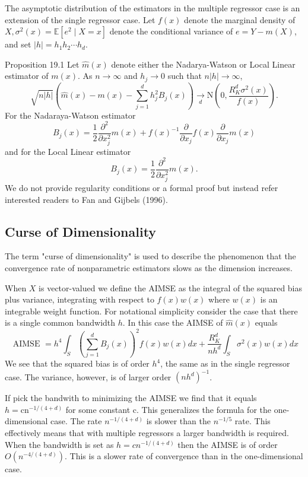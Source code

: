 \documentclass[10pt]{article}
\begin{document}
The asymptotic distribution of the estimators in the multiple regressor case is an extension of the single regressor case. Let $f(x)$ denote the marginal density of $X, \sigma^{2}(x)=\mathbb{E}\left[e^{2} \mid X=x\right]$ denote the conditional variance of $e=Y-m(X)$, and set $|h|=h_{1} h_{2} \cdots h_{d}$.

Proposition 19.1 Let $\hat{m}(x)$ denote either the Nadarya-Watson or Local Linear estimator of $m(x)$. As $n \rightarrow \infty$ and $h_{j} \rightarrow 0$ such that $n|h| \rightarrow \infty$,
$$
\sqrt{n|h|}\left(\widehat{m}(x)-m(x)-\sum_{j=1}^{d} h_{j}^{2} B_{j}(x)\right) \underset{d}{\longrightarrow} \mathrm{N}\left(0, \frac{R_{K}^{d} \sigma^{2}(x)}{f(x)}\right) .
$$
For the Nadaraya-Watson estimator
$$
B_{j}(x)=\frac{1}{2} \frac{\partial^{2}}{\partial x_{j}^{2}} m(x)+f(x)^{-1} \frac{\partial}{\partial x_{j}} f(x) \frac{\partial}{\partial x_{j}} m(x)
$$
and for the Local Linear estimator
$$
B_{j}(x)=\frac{1}{2} \frac{\partial^{2}}{\partial x_{j}^{2}} m(x) .
$$
We do not provide regularity conditions or a formal proof but instead refer interested readers to Fan and Gijbels (1996).

\subsection{Curse of Dimensionality}
The term "curse of dimensionality" is used to describe the phenomenon that the convergence rate of nonparametric estimators slows as the dimension increases.

When $X$ is vector-valued we define the AIMSE as the integral of the squared bias plus variance, integrating with respect to $f(x) w(x)$ where $w(x)$ is an integrable weight function. For notational simplicity consider the case that there is a single common bandwidth $h$. In this case the AIMSE of $\widehat{m}(x)$ equals
$$
\text { AIMSE }=h^{4} \int_{S}\left(\sum_{j=1}^{d} B_{j}(x)\right)^{2} f(x) w(x) d x+\frac{R_{K}^{d}}{n h^{d}} \int_{S} \sigma^{2}(x) w(x) d x
$$
We see that the squared bias is of order $h^{4}$, the same as in the single regressor case. The variance, however, is of larger order $\left(n h^{d}\right)^{-1}$.

If pick the bandwith to minimizing the AIMSE we find that it equals $h=\mathrm{cn}^{-1 /(4+d)}$ for some constant c. This generalizes the formula for the one-dimensional case. The rate $n^{-1 /(4+d)}$ is slower than the $n^{-1 / 5}$ rate. This effectively means that with multiple regressors a larger bandwidth is required. When the bandwidth is set as $h=c n^{-1 /(4+d)}$ then the AIMSE is of order $O\left(n^{-4 /(4+d)}\right)$. This is a slower rate of convergence than in the one-dimensional case.
\end{document}
